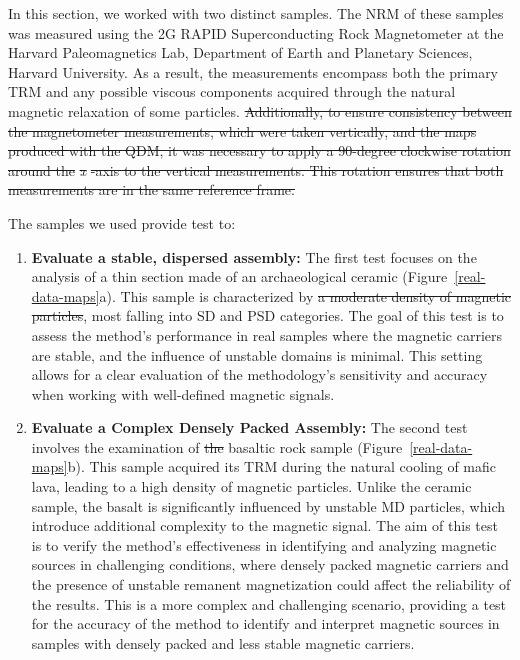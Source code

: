 \documentclass[onecolumn,12pt,a4paper]{article}
\providecommand{\DIFaddtex}[1]{{\protect\color{blue}\uwave{#1}}} %
\providecommand{\DIFdeltex}[1]{{\protect\color{red}\sout{#1}}}                      %
\providecommand{\DIFaddbegin}{} %
\providecommand{\DIFaddend}{} %
\providecommand{\DIFdelbegin}{} %
\providecommand{\DIFdelend}{} %
\providecommand{\DIFadd}[1]{\texorpdfstring{\DIFaddtex{#1}}{#1}} %
\providecommand{\DIFdel}[1]{\texorpdfstring{\DIFdeltex{#1}}{}} %
\newcommand{\DIFscaledelfig}{0.5}
\newlength{\DIFdelgraphicswidth} %
\newlength{\DIFdelgraphicsheight} %
\newcommand{\DIFaddincludegraphics}[2][]{{\color{blue}\fbox{\DIFOincludegraphics[#1]{#2}}}} %
\newcommand{\DIFdelincludegraphics}[2][]{%
\sbox{\DIFdelgraphicsbox}{\DIFOincludegraphics[#1]{#2}}%
\settoboxwidth{\DIFdelgraphicswidth}{\DIFdelgraphicsbox} %
\settoboxtotalheight{\DIFdelgraphicsheight}{\DIFdelgraphicsbox} %
\scalebox{\DIFscaledelfig}{%
\parbox[b]{\DIFdelgraphicswidth}{\usebox{\DIFdelgraphicsbox}\\[-\baselineskip] \rule{\DIFdelgraphicswidth}{0em}}\llap{\resizebox{\DIFdelgraphicswidth}{\DIFdelgraphicsheight}{%
\setlength{\unitlength}{\DIFdelgraphicswidth}%
\begin{picture}(1,1)%
\thicklines\linethickness{2pt} %
{\color[rgb]{1,0,0}\put(0,0){\framebox(1,1){}}}%
{\color[rgb]{1,0,0}\put(0,0){\line( 1,1){1}}}%
{\color[rgb]{1,0,0}\put(0,1){\line(1,-1){1}}}%
\end{picture}%
}\hspace*{3pt}}} %
} %
\DeclareRobustCommand{\DIFaddbegin}{\DIFOaddbegin \let\includegraphics\DIFaddincludegraphics} %
\DeclareRobustCommand{\DIFaddend}{\DIFOaddend \let\includegraphics\DIFOincludegraphics} %
\DeclareRobustCommand{\DIFdelbegin}{\DIFOdelbegin \let\includegraphics\DIFdelincludegraphics} %
\DeclareRobustCommand{\DIFdelend}{\DIFOaddend \let\includegraphics\DIFOincludegraphics} %
\begin{document}
In this section, we worked with two distinct samples. The NRM of these samples was measured using the 2G RAPID Superconducting Rock Magnetometer at the Harvard Paleomagnetics Lab, Department of Earth and Planetary Sciences, Harvard University. As a result, the measurements encompass both the primary TRM and any possible viscous components acquired through the natural magnetic relaxation of some particles. 
\DIFdelbegin \DIFdel{Additionally, to ensure consistency between the magnetometer measurements, which were taken vertically, and the maps produced with the QDM, it was necessary to apply a 90-degree clockwise rotation around the }\textit{\DIFdel{x}}%
\DIFdel{-axis to the vertical measurements. This rotation ensures that both measurements are in the same reference frame.
}\DIFdelend 

The samples we used provide test to:

\begin{enumerate}
\item \textbf{Evaluate a stable, dispersed assembly:} The first test focuses on the analysis of a thin section made of an archaeological ceramic (Figure~\ref{real-data-maps}a). This sample is characterized by \DIFdelbegin \DIFdel{a moderate density of magnetic particles}\DIFdelend \DIFaddbegin \DIFadd{well-dispersed dipolar sources}\DIFaddend , most falling into SD and PSD categories. The goal of this test is to assess the method’s performance in real samples where the magnetic carriers are stable, and the influence of unstable domains is minimal. This setting allows for a clear evaluation of the methodology’s sensitivity and accuracy when working with well-defined magnetic signals.

\item \textbf{Evaluate a Complex Densely Packed Assembly:} The second test involves the examination of \DIFdelbegin \DIFdel{the }\DIFdelend \DIFaddbegin \DIFadd{a thin section of a }\DIFaddend basaltic rock sample (Figure~\ref{real-data-maps}b). This sample acquired its TRM during the natural cooling of mafic lava, leading to a high density of magnetic particles. Unlike the ceramic sample, the basalt is significantly influenced by unstable MD particles, which introduce additional complexity to the magnetic signal. The aim of this test is to verify the method’s effectiveness in identifying and analyzing magnetic sources in challenging conditions, where densely packed magnetic carriers and the presence of unstable remanent magnetization could affect the reliability of the results. This is a more complex and challenging scenario, providing a test for the accuracy of the method to identify and interpret magnetic sources in samples with densely packed and less stable magnetic carriers.
\end{enumerate}
\end{document}
